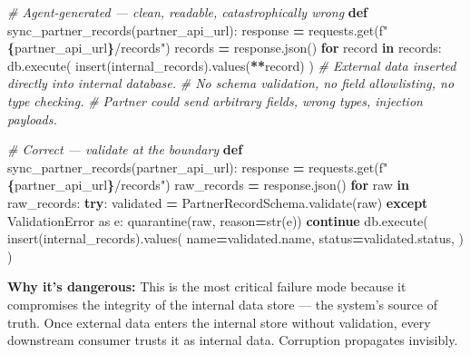 \documentclass[a4paper,11pt]{report}
\newenvironment{Shaded}{\begin{snugshade}}{\end{snugshade}}
\newcommand{\BuiltInTok}[1]{#1}
\newcommand{\CommentTok}[1]{\textcolor[rgb]{0.56,0.35,0.01}{\textit{#1}}}
\newcommand{\ControlFlowTok}[1]{\textcolor[rgb]{0.13,0.29,0.53}{\textbf{#1}}}
\newcommand{\ImportTok}[1]{#1}
\newcommand{\KeywordTok}[1]{\textcolor[rgb]{0.13,0.29,0.53}{\textbf{#1}}}
\newcommand{\NormalTok}[1]{#1}
\newcommand{\OperatorTok}[1]{\textcolor[rgb]{0.81,0.36,0.00}{\textbf{#1}}}
\newcommand{\SpecialCharTok}[1]{\textcolor[rgb]{0.81,0.36,0.00}{\textbf{#1}}}
\newcommand{\SpecialStringTok}[1]{\textcolor[rgb]{0.31,0.60,0.02}{#1}}
\begin{document}
\begin{Shaded}
\begin{Highlighting}[]
\CommentTok{\# Agent{-}generated — clean, readable, catastrophically wrong}
\KeywordTok{def}\NormalTok{ sync\_partner\_records(partner\_api\_url):}
\NormalTok{    response }\OperatorTok{=}\NormalTok{ requests.get(}\SpecialStringTok{f"}\SpecialCharTok{\{}\NormalTok{partner\_api\_url}\SpecialCharTok{\}}\SpecialStringTok{/records"}\NormalTok{)}
\NormalTok{    records }\OperatorTok{=}\NormalTok{ response.json()}
    \ControlFlowTok{for}\NormalTok{ record }\KeywordTok{in}\NormalTok{ records:}
\NormalTok{        db.execute(}
\NormalTok{            insert(internal\_records).values(}\OperatorTok{**}\NormalTok{record)}
\NormalTok{        )}
    \CommentTok{\# External data inserted directly into internal database.}
    \CommentTok{\# No schema validation, no field allowlisting, no type checking.}
    \CommentTok{\# Partner could send arbitrary fields, wrong types, injection payloads.}

\CommentTok{\# Correct — validate at the boundary}
\KeywordTok{def}\NormalTok{ sync\_partner\_records(partner\_api\_url):}
\NormalTok{    response }\OperatorTok{=}\NormalTok{ requests.get(}\SpecialStringTok{f"}\SpecialCharTok{\{}\NormalTok{partner\_api\_url}\SpecialCharTok{\}}\SpecialStringTok{/records"}\NormalTok{)}
\NormalTok{    raw\_records }\OperatorTok{=}\NormalTok{ response.json()}
    \ControlFlowTok{for}\NormalTok{ raw }\KeywordTok{in}\NormalTok{ raw\_records:}
        \ControlFlowTok{try}\NormalTok{:}
\NormalTok{            validated }\OperatorTok{=}\NormalTok{ PartnerRecordSchema.validate(raw)}
        \ControlFlowTok{except}\NormalTok{ ValidationError }\ImportTok{as}\NormalTok{ e:}
\NormalTok{            quarantine(raw, reason}\OperatorTok{=}\BuiltInTok{str}\NormalTok{(e))}
            \ControlFlowTok{continue}
\NormalTok{        db.execute(}
\NormalTok{            insert(internal\_records).values(}
\NormalTok{                name}\OperatorTok{=}\NormalTok{validated.name,}
\NormalTok{                status}\OperatorTok{=}\NormalTok{validated.status,}
\NormalTok{            )}
\NormalTok{        )}
\end{Highlighting}
\end{Shaded}

\textbf{Why it's dangerous:} This is the most critical failure mode
because it compromises the integrity of the internal data store --- the
system's source of truth. Once external data enters the internal store
without validation, every downstream consumer trusts it as internal
data. Corruption propagates invisibly.
\end{document}
